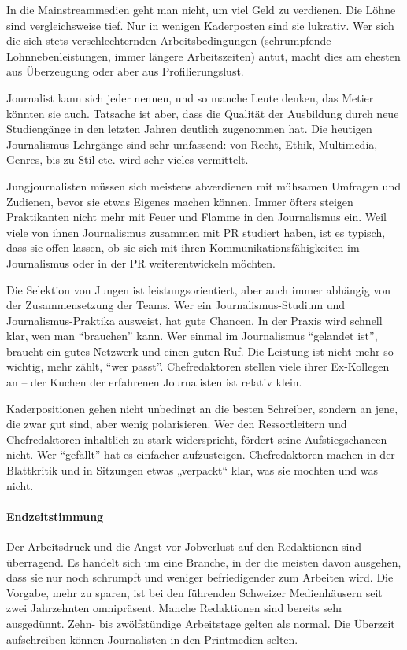 In die Mainstreammedien geht man nicht, um viel Geld zu verdienen. Die
Löhne sind vergleichsweise tief. Nur in wenigen Kaderposten sind sie
lukrativ. Wer sich die sich stets verschlechternden Arbeitsbedingungen
(schrumpfende Lohnnebenleistungen, immer längere Arbeitszeiten) antut,
macht dies am ehesten aus Überzeugung oder aber aus Profilierungslust.

Journalist kann sich jeder nennen, und so manche Leute denken, das
Metier könnten sie auch. Tatsache ist aber, dass die Qualität der
Ausbildung durch neue Studiengänge in den letzten Jahren deutlich
zugenommen hat. Die heutigen Journalismus-Lehrgänge sind sehr umfassend:
von Recht, Ethik, Multimedia, Genres, bis zu Stil etc. wird sehr vieles
vermittelt.

Jungjournalisten müssen sich meistens abverdienen mit mühsamen Umfragen
und Zudienen, bevor sie etwas Eigenes machen können. Immer öfters
steigen Praktikanten nicht mehr mit Feuer und Flamme in den Journalismus
ein. Weil viele von ihnen Journalismus zusammen mit PR studiert haben,
ist es typisch, dass sie offen lassen, ob sie sich mit ihren
Kommunikationsfähigkeiten im Journalismus oder in der PR
weiterentwickeln möchten.

Die Selektion von Jungen ist leistungsorientiert, aber auch immer
abhängig von der Zusammensetzung der Teams. Wer ein Journalismus-Studium
und Journalismus-Praktika ausweist, hat gute Chancen. In der Praxis wird
schnell klar, wen man ``brauchen'' kann. Wer einmal im Journalismus
``gelandet ist'', braucht ein gutes Netzwerk und einen guten Ruf. Die
Leistung ist nicht mehr so wichtig, mehr zählt, ``wer passt''.
Chefredaktoren stellen viele ihrer Ex-Kollegen an -- der Kuchen der
erfahrenen Journalisten ist relativ klein.

Kaderpositionen gehen nicht unbedingt an die besten Schreiber, sondern
an jene, die zwar gut sind, aber wenig polarisieren. Wer den
Ressortleitern und Chefredaktoren inhaltlich zu stark widerspricht,
fördert seine Aufstiegschancen nicht. Wer ``gefällt'' hat es einfacher
aufzusteigen. Chefredaktoren machen in der Blattkritik und in Sitzungen
etwas „verpackt`` klar, was sie mochten und was nicht.

\hypertarget{endzeitstimmung}{%
\paragraph{Endzeitstimmung}\label{endzeitstimmung}}

Der Arbeitsdruck und die Angst vor Jobverlust auf den Redaktionen sind
überragend. Es handelt sich um eine Branche, in der die meisten davon
ausgehen, dass sie nur noch schrumpft und weniger befriedigender zum
Arbeiten wird. Die Vorgabe, mehr zu sparen, ist bei den führenden
Schweizer Medienhäusern seit zwei Jahrzehnten omnipräsent. Manche
Redaktionen sind bereits sehr ausgedünnt. Zehn- bis zwölfstündige
Arbeitstage gelten als normal. Die Überzeit aufschreiben können
Journalisten in den Printmedien selten.

